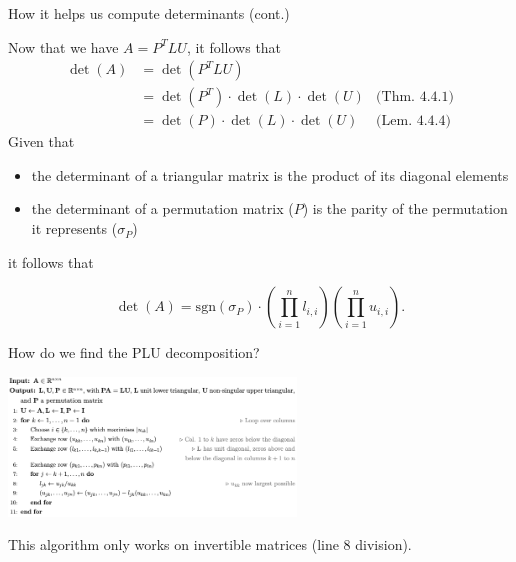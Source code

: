 \documentclass{beamer}
\begin{document}
\begin{frame}{How it helps us compute determinants (cont.)}

    Now that we have $A=P^T LU$, it follows that
    \begin{align*}
        \det(A)  & = \det(P^T L U) & \\
                 & = \det(P^T)\cdot \det(L)\cdot \det(U) & \text{(Thm. 4.4.1)} \\
                 & = \det(P)\cdot \det(L)\cdot \det(U)   & \text{(Lem. 4.4.4)}
    \end{align*}
    Given that
    \begin{itemize}
        \item the determinant of a triangular matrix is the product of its diagonal elements
        \item the determinant of a permutation matrix ($P$) is the parity of the permutation
            it represents ($\sigma_P$)
    \end{itemize}
    it follows that
    \begin{block}{}
        \[
            \det(A) = \text{sgn}(\sigma_P) \cdot \left( \prod_{i=1}^{n} l_{i,i} \right)
            \left( \prod_{i=1}^{n} u_{i,i} \right).
        \]
    \end{block}

\end{frame}

\begin{frame}{How do we find the PLU decomposition?}

    \begin{center}{}
        \includegraphics[height=140]{PLUcode.png}
    \end{center}

    \begin{alertblock}{}
        This algorithm only works on invertible matrices (line 8 division).
    \end{alertblock}

\end{frame}
\end{document}

